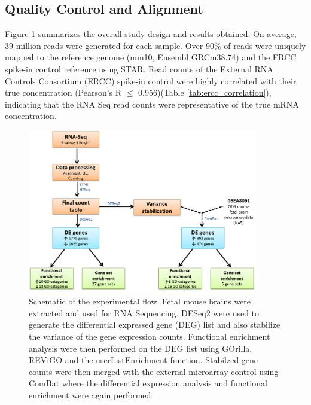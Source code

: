 \subsection{Quality Control and Alignment}
Figure \ref{fig:schematicMIA} summarizes the overall study design and results obtained.
On average, 39 million reads were generated for each sample. 
Over 90$\%$ of reads were uniquely mapped to the  reference genome (mm10, Ensembl GRCm38.74) and the ERCC spike-in control reference using STAR\cite{Dobin2013}. 
Read counts of the External RNA Controls Consortium (ERCC) spike-in control were highly correlated with their true concentration (Pearson’s R $\le$ 0.956)(Table \ref{tab:ercc_correlation}), indicating that the RNA Seq read counts were representative of the true mRNA concentration.
\begin{figure}[htbp]
	\centering
	\includegraphics[width=0.9\textwidth]{environmental_risk/image/er_flowchart.png}
	\caption{Schematic of the experimental flow. 
		Fetal mouse brains were extracted and used for RNA Sequencing. 
		DESeq2 were used to generate the differential expressed gene (DEG) list and also stabilize the variance of the gene expression counts. 
		Functional enrichment analysis were then performed on the DEG list using GOrilla, REViGO and the userListEnrichment function. 
		Stabilzed gene counts were then merged with the external microarray control using ComBat where the differential expression analysis and functional enrichment were again performed}\label{fig:schematicMIA}
\end{figure}
